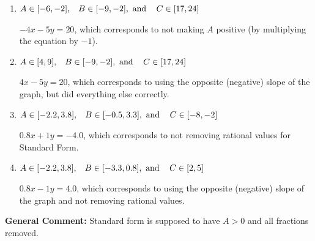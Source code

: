 \documentclass{extbook}[14pt]
\begin{document}
\begin{enumerate}
{\begin{enumerate}[label=\Alph*.]
* $4x + 5y = -20$, which is the correct option.
\item \( A \in [-6, -2], \hspace{3mm} B \in [-9, -2], \text{ and } \hspace{3mm} C \in [17, 24] \)

 $-4x - 5y = 20$, which corresponds to not making $A$ positive (by multiplying the equation by $-1$).
\item \( A \in [4, 9], \hspace{3mm} B \in [-9, -2], \text{ and } \hspace{3mm} C \in [17, 24] \)

 $4x - 5y = 20$, which corresponds to using the opposite (negative) slope of the graph, but did everything else correctly.
\item \( A \in [-2.2, 3.8], \hspace{3mm} B \in [-0.5, 3.3], \text{ and } \hspace{3mm} C \in [-8, -2] \)

 $0.8x + 1y = -4.0$, which corresponds to not removing rational values for Standard Form.
\item \( A \in [-2.2, 3.8], \hspace{3mm} B \in [-3.3, 0.8], \text{ and } \hspace{3mm} C \in [2, 5] \)

 $0.8x - 1y = 4.0$, which corresponds to using the opposite (negative) slope of the graph and not removing rational values.
\end{enumerate}

\textbf{General Comment:} Standard form is supposed to have $A > 0$ and all fractions removed.
}
\end{enumerate}
\end{document}
